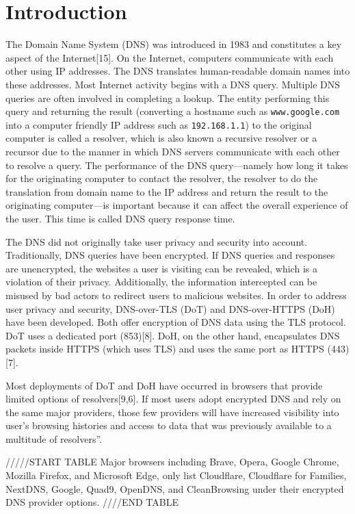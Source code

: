 \section{Introduction}\label{sec:intro}

The Domain Name System (DNS) was introduced in 1983 and constitutes a key aspect of the Internet[15].
On the Internet, computers communicate with each other using IP addresses.
The DNS translates human-readable domain names into these addresses.
Most Internet activity begins with a DNS query.
Multiple DNS queries are often involved in completing a lookup.
The entity performing this query and returning the result (converting a hostname such as \texttt{www.google.com} into a computer friendly IP address such as \texttt{192.168.1.1}) to the original computer is called a resolver, which is also known a recursive resolver or a recursor due to the  manner in which DNS servers communicate with each other to resolve a query.
The performance of the DNS query—namely how long it takes for the originating computer to contact the resolver, the resolver to do the translation from domain name to the IP address and return the result to the originating computer—is important because it can affect the overall experience of the user.
This time is called DNS query response time.

The DNS did not originally take user privacy and security into account.
Traditionally, DNS queries have been encrypted.
If DNS queries and responses are unencrypted, the websites a user is visiting can be revealed, which is a violation of their privacy.
Additionally, the information intercepted can be misused by bad actors to redirect users to malicious websites.
In order to address user privacy and security, DNS-over-TLS (DoT) and DNS-over-HTTPS (DoH) have been developed.
Both offer encryption of DNS data using the TLS protocol.
DoT uses a dedicated port (853)[8].
DoH, on the other hand, encapsulates DNS packets inside HTTPS (which uses TLS) and uses the same port as HTTPS (443)[7].

Most deployments of DoT and DoH have occurred in browsers that provide limited options of resolvers[9,6].
If most users adopt encrypted DNS and rely on the same major providers, those few providers will have increased visibility into user's browsing histories and access to data that was previously available to a multitude of resolvers”.

/////START TABLE
Major browsers including Brave, Opera, Google Chrome, Mozilla Firefox, and Microsoft Edge, only list Cloudflare, Cloudflare for Families, NextDNS, Google, Quad9, OpenDNS, and CleanBrowsing under their encrypted DNS provider options.
////END TABLE

